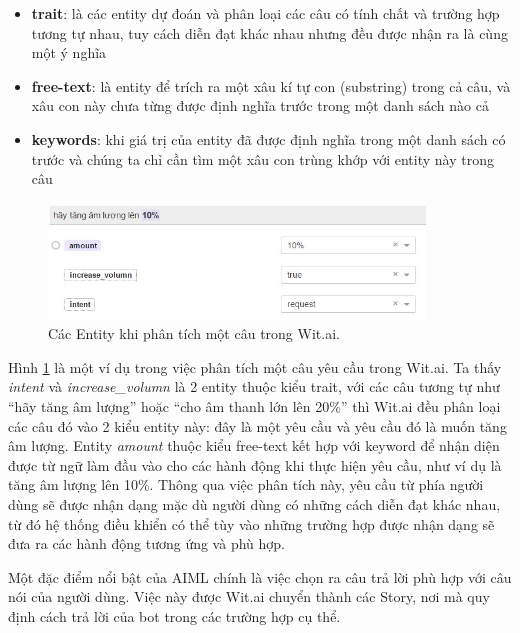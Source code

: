 \documentclass[12pt]{report}
\begin{document}
\begin{itemize}
	\item \textbf{trait}: là các entity dự đoán và phân loại các câu có tính chất và trường hợp tương tự nhau, tuy cách diễn đạt khác nhau nhưng đều được nhận ra là cùng một ý nghĩa
	\item \textbf{free-text}: là entity để trích ra một xâu kí tự con (substring) trong cả câu, và xâu con này chưa từng được định nghĩa trước trong một danh sách nào cả
	\item \textbf{keywords}: khi giá trị của entity đã được định nghĩa trong một danh sách có trước và chúng ta chỉ cần tìm một xâu con trùng khớp với entity này trong câu
\end{itemize}

\begin{figure}[H] 
	\centering
	\includegraphics[width=10cm]{Pics/Chap6/wit.JPG}
	\caption{Các Entity khi phân tích một câu trong Wit.ai.}
	\label{fig:entity}
\end{figure}

Hình \ref{fig:entity} là một ví dụ trong việc phân tích một câu yêu cầu trong Wit.ai. Ta thấy \textit{intent} và \textit{increase\_volumn} là 2 entity thuộc kiểu trait, với các câu tương tự như ``hãy tăng âm lượng'' hoặc ``cho âm thanh lớn lên 20\%'' thì Wit.ai đều phân loại các câu đó vào 2 kiểu entity này: đây là một yêu cầu và yêu cầu đó là muốn tăng âm lượng. Entity \textit{amount} thuộc kiểu free-text kết hợp với keyword để nhận diện được từ ngữ làm đầu vào cho các hành động khi thực hiện yêu cầu, như ví dụ là tăng âm lượng lên 10\%. Thông qua việc phân tích này, yêu cầu từ phía người dùng sẽ được nhận dạng mặc dù người dùng có những cách diễn đạt khác nhau, từ đó hệ thống điều khiển có thể tùy vào những trường hợp được nhận dạng sẽ đưa ra các hành động tương ứng và phù hợp.

Một đặc điểm nổi bật của AIML chính là việc chọn ra câu trả lời phù hợp với câu nói của người dùng. Việc này được Wit.ai chuyển thành các Story, nơi mà quy định cách trả lời của bot trong các trường hợp cụ thể. 
 
\end{document}

